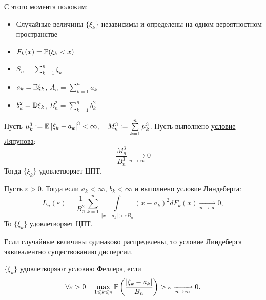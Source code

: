 \documentclass[../TV&MS.tex]{subfiles}
\begin{document}
С этого момента положим:
\begin{itemize}
    \item Случайные величины $\{ \xi_k \}$ независимы и определены на одном вероятностном пространстве
    \item $F_k(x) = \mathbb{P} (\xi_k < x)$
    \item $S_n = \sum\limits_{k=1}^{n} \xi_k$
    \item $a_k = \mathbb{E} \xi_k$, $A_n = \sum\limits_{k=1}^{n} a_k$ 
    \item $b_k^2 = \mathbb{D} \xi_k$, $B_n^2 = \sum\limits_{k=1}^{n} b_k^2$
\end{itemize} 

\begin{Th}[Ляпунова]
    Пусть $\mu_k^3 := \mathbb{E} \left| \xi_k - a_k \right|^3 < \infty, \quad
    M_n^3 := \sum\limits_{k=1}^{n} \mu_k^3$. Пусть выполнено \uline{условие Ляпунова}:
    \begin{equation}\label{Lyapunov}
        \dfrac{M_n^3}{B_n^3} \xrightarrow[n \rightarrow \infty]{} 0
    \end{equation}
    Тогда $\{ \xi_k \}$ удовлетворяет ЦПТ.
\end{Th}

\begin{Th}[Линдеберга]
    Пусть $\varepsilon > 0$. Тогда если  $a_k < \infty$, $b_k < \infty$ и выполнено \uline{условие Линдеберга}:
    \begin{equation}\label{Lindeberg}
        L_n(\varepsilon) = \dfrac{1}{B_n^2} \sum\limits_{k=1}^{n} 
        \int\limits_{ \left| x - a_k \right| > \varepsilon B_n}^{}
        \left( x - a_k \right)^2 dF_k(x) \xrightarrow[n \rightarrow \infty]{}
        0,
    \end{equation} 
    То $\{ \xi_k \}$ удовлетворяет ЦПТ.
\end{Th} 

\begin{Note}
    Если случайные величины одинаково распределены, то условие Линдеберга эквивалентно существованию дисперсии.
\end{Note}

\begin{Def}
    $\{ \xi_k \} $ удовлетворяют \uline{условию Феллера}, если
    \begin{equation}\label{Feller}
        \forall \varepsilon > 0 \quad
        \max\limits_{1 \leqslant k \leqslant n}
        \mathbb{P} \left( \dfrac{ \left| \xi_k - a_k \right| }{B_n} \right) > \varepsilon
        \xrightarrow[n \rightarrow \infty]{} 0. 
    \end{equation}
\end{Def} 
\end{document}
